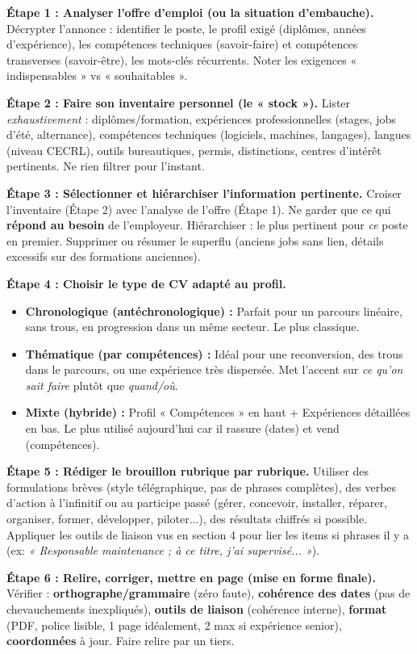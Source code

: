 \documentclass[11pt]{article}
\newcommand{\cle}[1]{{\popxbold\color{popdark}#1}}
\begin{document}
\begin{methode}
\textbf{Étape 1 : Analyser l'offre d'emploi (ou la situation d'embauche).}
Décrypter l'annonce : identifier le \cle{poste}, le \cle{profil exigé} (diplômes, années d'expérience), les \cle{compétences techniques} (savoir-faire) et \cle{compétences transverses} (savoir-être), les \cle{mots-clés} récurrents. Noter les exigences « indispensables » vs « souhaitables ».

\textbf{Étape 2 : Faire son inventaire personnel (le « stock »).}
Lister \emph{exhaustivement} : diplômes/formation, expériences professionnelles (stages, jobs d'été, alternance), compétences techniques (logiciels, machines, langages), langues (niveau CECRL), outils bureautiques, permis, distinctions, centres d'intérêt pertinents. Ne rien filtrer pour l'instant.

\textbf{Étape 3 : Sélectionner et hiérarchiser l'information pertinente.}
Croiser l'inventaire (Étape 2) avec l'analyse de l'offre (Étape 1). Ne garder que ce qui \textbf{répond au besoin} de l'employeur. Hiérarchiser : le plus pertinent pour \emph{ce} poste en premier. Supprimer ou résumer le superflu (anciens jobs sans lien, détails excessifs sur des formations anciennes).

\textbf{Étape 4 : Choisir le type de CV adapté au profil.}
\begin{itemize}
    \item \textbf{Chronologique (antéchronologique) :} Parfait pour un parcours linéaire, sans trous, en progression dans un même secteur. Le plus classique.
    \item \textbf{Thématique (par compétences) :} Idéal pour une reconversion, des trous dans le parcours, ou une expérience très dispersée. Met l'accent sur \emph{ce qu'on sait faire} plutôt que \emph{quand/où}.
    \item \textbf{Mixte (hybride) :} Profil « Compétences » en haut + Expériences détaillées en bas. Le plus utilisé aujourd'hui car il rassure (dates) et vend (compétences).
\end{itemize}

\textbf{Étape 5 : Rédiger le brouillon rubrique par rubrique.}
Utiliser des \cle{formulations brèves} (style télégraphique, pas de phrases complètes), des \cle{verbes d'action} à l'infinitif ou au participe passé (gérer, concevoir, installer, réparer, organiser, former, développer, piloter...), des \cle{résultats chiffrés} si possible. Appliquer les outils de liaison vus en section 4 pour lier les items si phrases il y a (ex: \emph{« Responsable maintenance ; à ce titre, j'ai supervisé... »}).

\textbf{Étape 6 : Relire, corriger, mettre en page (mise en forme finale).}
Vérifier : \textbf{orthographe/grammaire} (zéro faute), \textbf{cohérence des dates} (pas de chevauchements inexpliqués), \textbf{outils de liaison} (cohérence interne), \textbf{format} (PDF, police lisible, 1 page idéalement, 2 max si expérience senior), \textbf{coordonnées} à jour. Faire relire par un tiers.
\end{methode}
\end{document}
